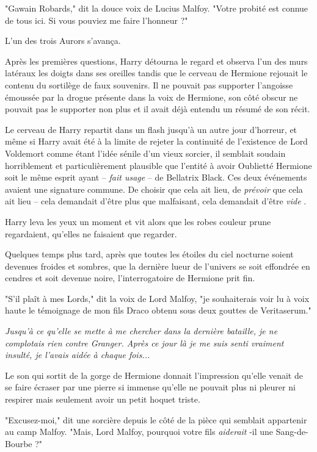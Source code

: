"Gawain Robards," dit la douce voix de Lucius Malfoy. "Votre probité est connue de tous ici. Si vous pouviez me faire l'honneur ?"

L'un des trois Aurors s'avança.

Après les premières questions, Harry détourna le regard et observa l'un des murs latéraux les doigts dans ses oreilles tandis que le cerveau de Hermione rejouait le contenu du sortilège de faux souvenirs. Il ne pouvait pas supporter l'angoisse émoussée par la drogue présente dans la voix de Hermione, son côté obscur ne pouvait pas le supporter non plus et il avait déjà entendu un résumé de son récit.

Le cerveau de Harry repartit dans un flash jusqu'à un autre jour d'horreur, et même si Harry avait été à la limite de rejeter la continuité de l'existence de Lord Voldemort comme étant l'idée sénile d'un vieux sorcier, il semblait soudain horriblement et particulièrement plausible que l'entité à avoir Oublietté Hermione soit le même esprit ayant – \emph{fait usage}  – de Bellatrix Black. Ces deux événements avaient une signature commune. De choisir que cela ait lieu, de \emph{prévoir}  que cela ait lieu – cela demandait d'être plus que malfaisant, cela demandait d'être \emph{vide} .

Harry leva les yeux un moment et vit alors que les robes couleur prune regardaient, qu'elles ne faisaient que regarder.

Quelques temps plus tard, après que toutes les étoiles du ciel nocturne soient devenues froides et sombres, que la dernière lueur de l'univers se soit effondrée en cendres et soit devenue noire, l'interrogatoire de Hermione prit fin.

"S'il plaît à mes Lords," dit la voix de Lord Malfoy, "je souhaiterais voir lu à voix haute le témoignage de mon fils Draco obtenu sous deux gouttes de Veritaserum."

\emph{Jusqu'à ce qu'elle se mette à me chercher dans la dernière bataille, je ne complotais rien contre Granger. Après ce jour là je me suis senti vraiment insulté, je l'avais aidée à chaque fois...} 

Le son qui sortit de la gorge de Hermione donnait l'impression qu'elle venait de se faire écraser par une pierre si immense qu'elle ne pouvait plus ni pleurer ni respirer mais seulement avoir un petit hoquet triste.

"Excusez-moi," dit une sorcière depuis le côté de la pièce qui semblait appartenir au camp Malfoy. "Mais, Lord Malfoy, pourquoi votre fils \emph{aiderait} -il une Sang-de-Bourbe ?"

